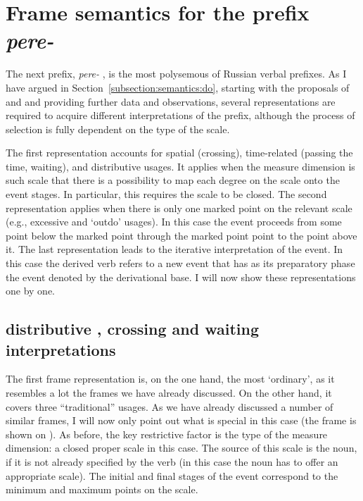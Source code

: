 \section{Frame semantics for the prefix \textit{pere-}  }\label{section:frame:pere}
The next prefix, \textit{pere-}  , is the most polysemous of Russian verbal prefixes. As I have argued in Section~\ref{subsection:semantics:do}, starting with the proposals of \citet{Demjjanow:97} and \citet{Kagan:book} and providing further data and observations, several representations are required to acquire different interpretations of the prefix, although the process of selection is fully dependent on the type of the scale.

The first representation accounts for spatial  (crossing), time-related (passing the time, waiting), and distributive  usages. It applies when the measure dimension is such scale that there is a possibility to map each degree on the scale onto the event stages. In particular, this requires the scale to be closed. The second representation applies when there is only one marked point on the relevant scale (e.g., excessive  and `outdo' usages). In this case the event proceeds from some point below the marked point through the marked point point to the point above it. The last representation leads to the iterative interpretation  of the event. In this case the derived verb refers to a new event that has as its preparatory phase the event denoted by the derivational base. I will now show these representations one by one. 

\subsection{distributive , crossing and waiting interpretations}
The first frame representation is, on the one hand, the most `ordinary', as it resembles a lot the frames we have already discussed. On the other hand, it covers three ``traditional'' usages. As we have already discussed a number of similar frames, I will now only point out what is special in this case (the frame is shown on ). As before, the key restrictive factor is the type of the measure dimension: a closed proper scale in this case. The source of this scale is the noun, if it is not already specified by the verb (in this case the noun has to offer an appropriate scale). The initial and final stages of the event correspond to the minimum and maximum points on the scale. 

